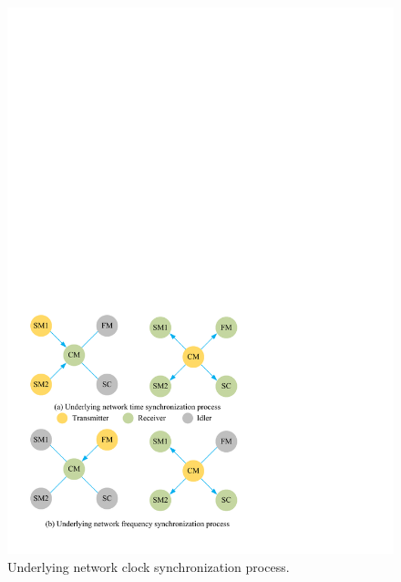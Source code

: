 \documentclass[conference]{IEEEtran}
\begin{document}
\begin{figure}[h]
	\centerline{\includegraphics[scale=0.6]{fig4.eps}}
	\caption{Underlying network clock synchronization process.}
	\label{fig4}
\end{figure}


\end{document}
